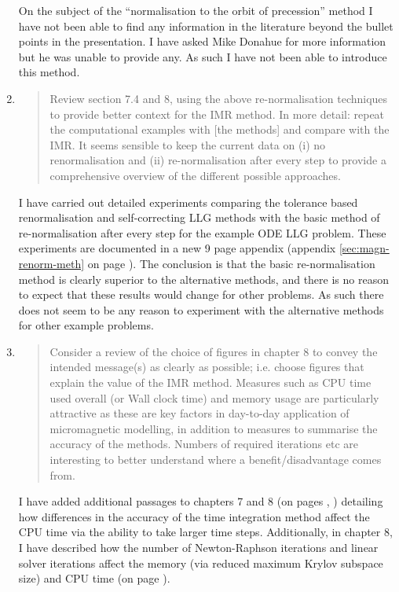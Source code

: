 \documentclass[12pt,a4paper,pdftex]{article}
\begin{document}
\begin{enumerate}
  On the subject of the ``normalisation to the orbit of precession'' method I have not been able to find any information in the literature beyond the bullet points in the presentation.
  I have asked Mike Donahue for more information but he was unable to provide any.
  As such I have not been able to introduce this method.

\item
  \begin{quotation}
    Review section 7.4 and 8, using the above re-normalisation techniques
    to provide better context for the IMR method. In more detail: repeat
    the computational examples with [the methods] and compare with the IMR.
    It seems sensible to keep the current data on (i) no renormalisation
    and (ii) re-normalisation after every step to provide a comprehensive
    overview of the different possible approaches.
  \end{quotation}
  I have carried out detailed experiments comparing the tolerance based renormalisation and self-correcting LLG methods with the basic method of re-normalisation after every step for the example ODE LLG problem.
  These experiments are documented in a new 9 page appendix (appendix \ref{sec:magn-renorm-meth} on page \pageref{sec:magn-renorm-meth}).
  The conclusion is that the basic re-normalisation method is clearly superior to the alternative methods, and there is no reason to expect that these results would change for other problems.
  As such there does not seem to be any reason to experiment with the alternative methods for other example problems.

\item
  \begin{quotation}
    Consider a review of the choice of figures in chapter 8 to convey
    the intended message(s) as clearly as possible; i.e. choose figures
    that explain the value of the IMR method. Measures such as CPU time
    used overall (or Wall clock time) and memory usage are particularly
    attractive as these are key factors in day-to-day application of
    micromagnetic modelling, in addition to measures to summarise the
    accuracy of the methods. Numbers of required iterations etc are
    interesting to better understand where a benefit/disadvantage comes
    from.
  \end{quotation}
  I have added additional passages to chapters 7 and 8 (on pages \pageref{cpu-correction-1}, \pageref{cpu-correction-2}) detailing how differences in the accuracy of the time integration method affect the CPU time via the ability to take larger time steps.
  Additionally, in chapter 8, I have described how the number of Newton-Raphson iterations and linear solver iterations affect the memory (via reduced maximum Krylov subspace size) and CPU time (on page \pageref{mem-cpu-solver-correction}).


\end{enumerate}
\end{document}

